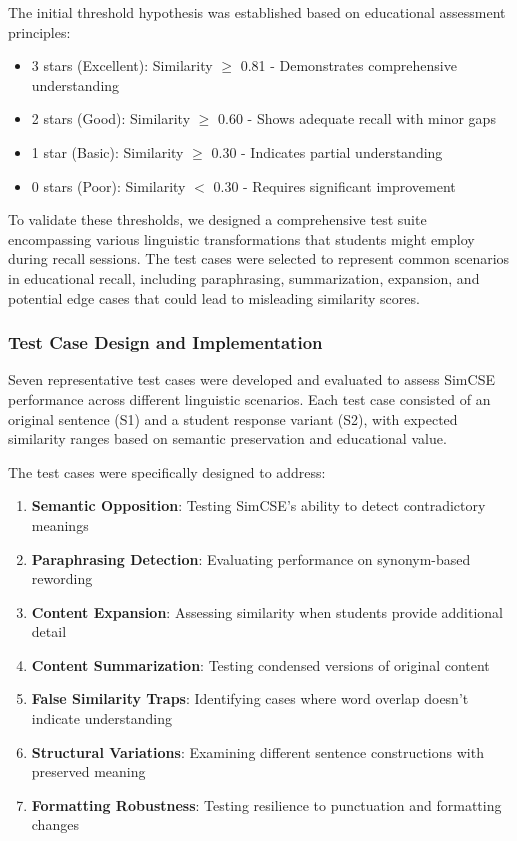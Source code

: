{The initial threshold hypothesis was established based on educational assessment principles:
\begin{itemize}
    \item 3 stars (Excellent): Similarity $\geq$ 0.81 - Demonstrates comprehensive understanding
    \item 2 stars (Good): Similarity $\geq$ 0.60 - Shows adequate recall with minor gaps
    \item 1 star (Basic): Similarity $\geq$ 0.30 - Indicates partial understanding
    \item 0 stars (Poor): Similarity $<$ 0.30 - Requires significant improvement
\end{itemize}

To validate these thresholds, we designed a comprehensive test suite encompassing various linguistic transformations that students might employ during recall sessions. The test cases were selected to represent common scenarios in educational recall, including paraphrasing, summarization, expansion, and potential edge cases that could lead to misleading similarity scores.

\subsubsection{Test Case Design and Implementation}

Seven representative test cases were developed and evaluated to assess SimCSE performance across different linguistic scenarios. Each test case consisted of an original sentence (S1) and a student response variant (S2), with expected similarity ranges based on semantic preservation and educational value.

The test cases were specifically designed to address:
\begin{enumerate}
    \item \textbf{Semantic Opposition}: Testing SimCSE's ability to detect contradictory meanings
    \item \textbf{Paraphrasing Detection}: Evaluating performance on synonym-based rewording
    \item \textbf{Content Expansion}: Assessing similarity when students provide additional detail
    \item \textbf{Content Summarization}: Testing condensed versions of original content
    \item \textbf{False Similarity Traps}: Identifying cases where word overlap doesn't indicate understanding
    \item \textbf{Structural Variations}: Examining different sentence constructions with preserved meaning
    \item \textbf{Formatting Robustness}: Testing resilience to punctuation and formatting changes
\end{enumerate}

}
